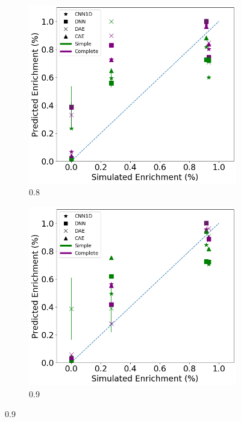 \begin{figure}[H]
     \centering
     \begin{subfigure}[b]{0.49\textwidth}
         \centering
         \includegraphics[width=\textwidth]{images/measured_uranium_08.png}
         \caption{0.8}
         \label{fig:measured_uranium_08}
     \end{subfigure}
     \hfill
     \begin{subfigure}[b]{0.49\textwidth}
         \centering
         \includegraphics[width=\textwidth]{images/measured_uranium_09.png}
         \caption{0.9}
         \label{fig:measured_uranium_09}
     \end{subfigure}


\end{figure}

